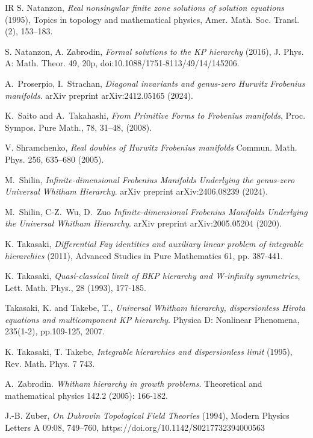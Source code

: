\documentclass[12pt,a4paper]{amsart}
\newcommand{\<}{\left<}
\renewcommand{\>}{\right>}
\numberwithin{equation}{section}
\begin{document}
\begin{thebibliography}{IR}
 S. Natanzon, \textit{Real nonsingular finite zone solutions of solution equations} (1995), Topics in topology and mathematical physics, Amer. Math. Soc. Transl. (2), 153--183.

 S. Natanzon, A. Zabrodin, \textit{Formal solutions to the KP hierarchy} (2016), J. Phys. A: Math. Theor. 49, 20p, doi:10.1088/1751-8113/49/14/145206.

 A.~Proserpio, I.~Strachan, \textit{Diagonal invariants and genus-zero Hurwitz Frobenius manifolds}. arXiv preprint arXiv:2412.05165 (2024).
 
	K.~Saito and A.~Takahashi,
	{\it From Primitive Forms to Frobenius manifolds},
	Proc. Sympos. Pure Math., 78, 31--48, (2008).

 V. Shramchenko, \textit{Real doubles of Hurwitz Frobenius manifolds}
 Commun. Math. Phys. 256, 635–680 (2005).

 M.~Shilin, \textit{Infinite-dimensional Frobenius Manifolds Underlying the genus-zero Universal Whitham Hierarchy}. arXiv preprint arXiv:2406.08239 (2024).

 M.~Shilin, C-Z.~Wu, D.~Zuo  \textit{Infinite-dimensional Frobenius Manifolds Underlying the Universal Whitham Hierarchy}. arXiv preprint arXiv:2005.05204 (2020).

K. Takasaki, \textit{Differential Fay identities and auxiliary linear problem of integrable hierarchies} (2011), Advanced Studies in Pure Mathematics 61, pp. 387-441.

K. Takasaki, \textit{Quasi-classical limit of BKP hierarchy and W-infinity symmetries}, Lett. Math. Phys., 28 (1993), 177-185.


Takasaki, K. and Takebe, T., \textit{Universal Whitham hierarchy, dispersionless Hirota equations and multicomponent KP hierarchy}. Physica D: Nonlinear Phenomena, 235(1-2), pp.109-125, 2007.


 K. Takasaki, T. Takebe, \textit{ Integrable hierarchies and dispersionless limit} (1995), Rev. Math. Phys. 7 743.
%

 A.~Zabrodin. \textit{Whitham hierarchy in growth problems}. Theoretical and mathematical physics 142.2 (2005): 166-182.

 J.-B. Zuber, \textit{On Dubrovin Topological Field Theories} (1994), Modern Physics Letters A 09:08, 749--760, https://doi.org/10.1142/S0217732394000563

\end{thebibliography}
\end{document}
